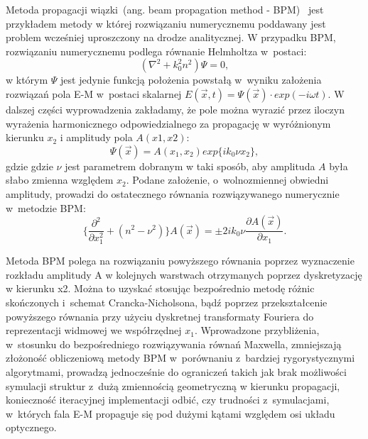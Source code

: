 Metoda propagacji wiązki~(ang. beam propagation method - BPM)~\cite{scarmozzino2000numerical,van1981beam} jest przykładem metody w której rozwiązaniu numerycznemu poddawany jest problem wcześniej uproszczony na drodze analitycznej. W przypadku BPM, rozwiązaniu numerycznemu podlega równanie Helmholtza w~postaci:
\begin{equation}
 ( \nabla ^2 + k_0^2 n^2 ) \Psi = 0,
\end{equation}
w którym $\Psi$ jest jedynie funkcją położenia powstałą w~wyniku założenia rozwiązań pola E-M w~postaci skalarnej $E(\vec{x},t)=\Psi(\vec{x})\cdot exp(-i\omega t)$. W dalszej części wyprowadzenia zakładamy, że pole można wyrazić przez iloczyn wyrażenia harmonicznego odpowiedzialnego za propagację w wyróżnionym kierunku $x_2$ i amplitudy pola $A(x1,x2)$:
\begin{equation}
\Psi(\vec{x})=A(x_1,x_2) exp\{ik_0\nu x_2\}, 
\end{equation}
gdzie gdzie $\nu$ jest parametrem dobranym w taki sposób, aby amplituda $A$ była słabo zmienna względem $x_2$. Podane założenie, o~wolnozmiennej obwiedni amplitudy, prowadzi do ostatecznego równania rozwiązywanego numerycznie w~metodzie BPM:
\begin{equation}
 \Big\{  \frac{\partial^2 }{\partial x_1^2 } + (n^2 - \nu^2) \Big\} A(\vec{x}) = \pm  2ik_0\nu \frac{\partial A (\vec{x})}{\partial x_1}.
\end{equation}

Metoda BPM polega na rozwiązaniu powyższego równania poprzez wyznaczenie rozkładu amplitudy A w kolejnych warstwach otrzymanych poprzez dyskretyzację w kierunku x2. Można to uzyskać stosując bezpośrednio metodę różnic skończonych i~schemat Crancka-Nicholsona, bądź poprzez przekształcenie powyższego równania przy użyciu dyskretnej transformaty Fouriera do reprezentacji widmowej we współrzędnej $x_1$. Wprowadzone przybliżenia, w~stosunku do bezpośredniego rozwiązywania równań Maxwella, zmniejszają złożoność obliczeniową metody BPM w~porównaniu z~bardziej rygorystycznymi algorytmami, prowadzą jednocześnie do ograniczeń takich jak brak możliwości symulacji struktur z~dużą zmiennością geometryczną w kierunku propagacji, konieczność iteracyjnej implementacji odbić, czy trudności z~symulacjami, w~których fala E-M propaguje się pod dużymi kątami względem osi układu optycznego.



 
